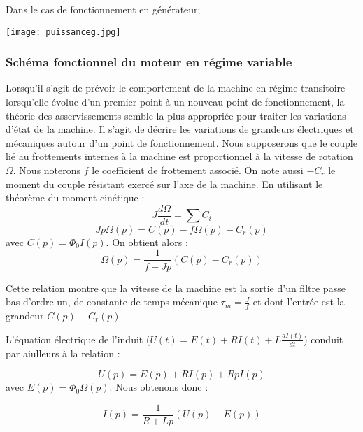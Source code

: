 \documentclass{article}
\begin{document}
Dans le cas de fonctionnement en générateur;

\begin{center}
    \texttt{[image: puissanceg.jpg]}
\end{center}



\subsubsection{Schéma fonctionnel du moteur en régime variable}
Lorsqu'il s'agit de prévoir le comportement de la machine en régime transitoire lorsqu'elle évolue d'un premier point à un nouveau point de fonctionnement, la théorie des asservissements semble la plus appropriée pour traiter les variations d'état de la machine. Il s'agit de décrire les variations de grandeurs électriques et mécaniques autour d'un point de fonctionnement. Nous supposerons que le couple lié au frottements internes à la machine est proportionnel à la vitesse de rotation $\Omega$. Nous noterons $f$ le coefficient de frottement associé. On note aussi $-C_r$ le moment du couple résistant exercé sur l'axe de la machine. 
\medskip
En utilisant le théorème du moment cinétique :
\begin{equation}
    J \frac{d\Omega}{dt} = \sum C_i
\end{equation}
\begin{equation}
    Jp\Omega(p) = C(p) - f\Omega(p) - C_r(p)
\end{equation}
avec $C(p) = \Phi_0 I(p)$. On obtient alors :
\begin{equation}
    \Omega (p) = \frac{1}{f + Jp}(C(p) - C_r(p) )
\end{equation}

Cette relation montre que la vitesse de la machine est la sortie d'un filtre passe bas d'ordre un, de constante de temps mécanique $\tau_m = \frac{J}{f}$ et dont l'entrée est la grandeur $C(p) - C_r (p)$.\medskip

L'équation électrique de l'induit ($U(t) = E(t) + RI(t) + L \frac{dI (t)}{dt}$) conduit par aiulleurs à la relation :

\begin{equation}
    U(p) = E(p) + RI(p) + RpI(p) 
\end{equation}
avec $E(p)=\Phi_0 \Omega(p)$. Nous obtenons donc :

\begin{equation}
    I(p) = \frac{1}{R + Lp}(U(p) - E(p))
\end{equation}
\end{document}
